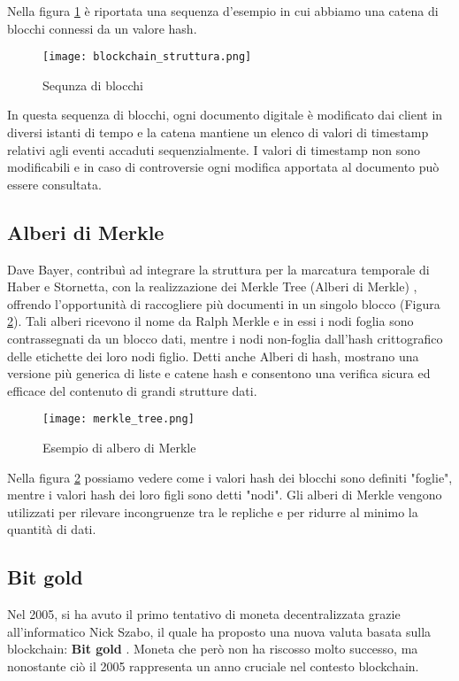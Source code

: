 Nella figura \ref{fig:blockchain_struttura} è riportata una sequenza d'esempio in cui abbiamo una catena di blocchi connessi da un valore hash.

\begin{figure}[h]
  \centering
  \texttt{[image: blockchain\_struttura.png]}
  \caption{Sequnza di blocchi}
  \label{fig:blockchain_struttura}
\end{figure}

In questa sequenza di blocchi, ogni documento digitale è modificato dai client in diversi istanti di tempo e la catena mantiene un elenco di valori di timestamp relativi agli eventi accaduti sequenzialmente. I valori di timestamp non sono modificabili e in caso di controversie ogni modifica apportata al documento può essere consultata.

\subsection{Alberi di Merkle}
Dave Bayer, contribuì ad integrare la struttura per la marcatura temporale di Haber e Stornetta, con la realizzazione dei Merkle Tree (Alberi di Merkle) \cite{bayer1993improving}, offrendo l'opportunità di raccogliere più documenti in un singolo blocco (Figura \ref{fig:merkle_tree}). Tali alberi ricevono il nome da Ralph Merkle e in essi i nodi foglia sono contrassegnati da un blocco dati, mentre i nodi non-foglia dall'hash crittografico delle etichette dei loro nodi figlio. Detti anche Alberi di hash, mostrano una versione più generica di liste e catene hash e consentono una verifica sicura ed efficace del contenuto di grandi strutture dati.

\begin{figure}[h]
  \centering
  \texttt{[image: merkle\_tree.png]}
  \caption{Esempio di albero di Merkle}
  \label{fig:merkle_tree}
\end{figure}

Nella figura \ref{fig:merkle_tree} possiamo vedere come i valori hash dei blocchi sono definiti "foglie", mentre i valori hash dei loro figli sono detti "nodi". Gli alberi di Merkle vengono utilizzati per rilevare incongruenze tra le repliche e per ridurre al minimo la quantità di dati.

\subsection{Bit gold}
Nel 2005, si ha avuto il primo tentativo di moneta decentralizzata grazie all'informatico Nick Szabo, il quale ha proposto una nuova valuta basata sulla blockchain: \textbf{Bit gold} \cite{szabo_2005}. Moneta che però non ha riscosso molto successo, ma nonostante ciò il 2005 rappresenta un anno cruciale nel contesto blockchain.

